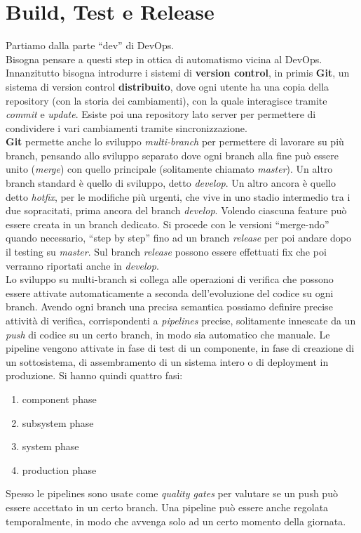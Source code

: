 \documentclass[a4paper,12pt, oneside]{book}
\begin{document}
\section{Build, Test e Release}
Partiamo dalla parte ``dev'' di DevOps.\\
Bisogna pensare a questi step in ottica di automatismo vicina al DevOps. \\
Innanzitutto bisogna introdurre i sistemi di \textbf{version control}, in primis
\textbf{Git}, un sistema di version control \textbf{distribuito}, dove ogni
utente ha una copia della repository (con la storia dei cambiamenti), con la
quale interagisce tramite \textit{commit} e \textit{update}. Esiste poi una
repository lato server per permettere di condividere i vari cambiamenti tramite
sincronizzazione.\\
\textbf{Git} permette anche lo sviluppo \textit{multi-branch} per permettere di
lavorare su più branch, pensando allo sviluppo separato dove ogni branch alla
fine può essere unito (\textit{merge}) con quello principale (solitamente
chiamato \textit{master}). Un altro branch standard è quello di sviluppo, detto
\textit{develop}. Un altro ancora è quello detto \textit{hotfix}, per le
modifiche più urgenti, che vive in uno stadio intermedio tra i due
sopracitati, prima ancora del branch \textit{develop}. Volendo ciascuna feature
può essere creata in un branch dedicato. Si procede con le versioni
``merge-ndo'' quando necessario, ``step by step'' fino ad un branch
\textit{release} per poi andare dopo il testing su \textit{master}. Sul branch
\textit{release} possono essere effettuati fix che poi verranno riportati anche
in \textit{develop}.\\
Lo sviluppo su multi-branch si collega alle operazioni di verifica che possono
essere attivate automaticamente a seconda dell'evoluzione del codice su ogni
branch. Avendo ogni branch una precisa semantica possiamo definire precise
attività di verifica, corrispondenti a \textit{pipelines} precise, solitamente
innescate da un \textit{push} di codice su un certo branch, in modo sia
automatico che manuale. Le pipeline vengono attivate in fase di test di un
componente, in fase di creazione di un sottosistema, di assembramento di un
sistema intero o di deployment in produzione. Si hanno quindi quattro fasi:
\begin{enumerate}
  \item component phase
  \item subsystem phase
  \item system phase
  \item production phase
\end{enumerate}
Spesso le pipelines sono usate
come \textit{quality gates} per valutare se un push può essere accettato in un
certo branch. Una pipeline può essere anche regolata temporalmente, in modo che
avvenga solo ad un certo momento della giornata.
\end{document}
